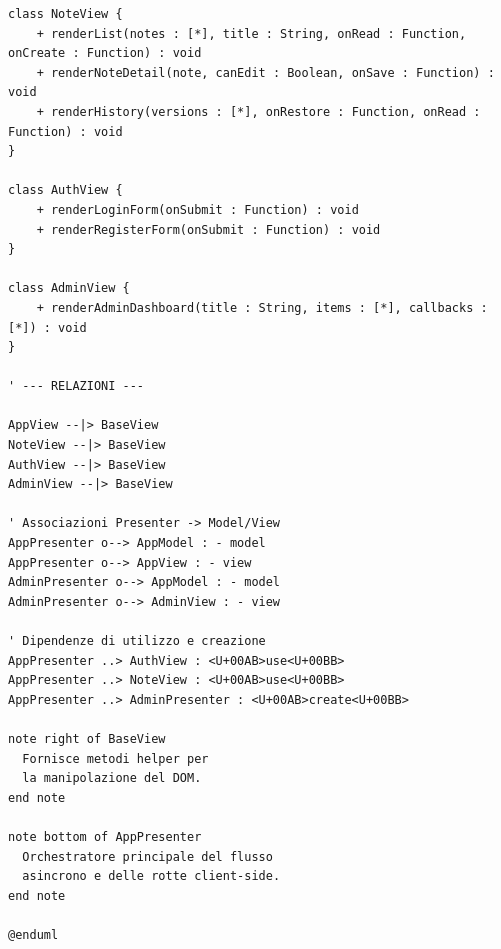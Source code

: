 \begin{verbatim}
class NoteView {
    + renderList(notes : [*], title : String, onRead : Function, onCreate : Function) : void
    + renderNoteDetail(note, canEdit : Boolean, onSave : Function) : void
    + renderHistory(versions : [*], onRestore : Function, onRead : Function) : void
}

class AuthView {
    + renderLoginForm(onSubmit : Function) : void
    + renderRegisterForm(onSubmit : Function) : void
}

class AdminView {
    + renderAdminDashboard(title : String, items : [*], callbacks : [*]) : void
}

' --- RELAZIONI ---

AppView --|> BaseView
NoteView --|> BaseView
AuthView --|> BaseView
AdminView --|> BaseView

' Associazioni Presenter -> Model/View
AppPresenter o--> AppModel : - model
AppPresenter o--> AppView : - view
AdminPresenter o--> AppModel : - model
AdminPresenter o--> AdminView : - view

' Dipendenze di utilizzo e creazione
AppPresenter ..> AuthView : <U+00AB>use<U+00BB>
AppPresenter ..> NoteView : <U+00AB>use<U+00BB>
AppPresenter ..> AdminPresenter : <U+00AB>create<U+00BB>

note right of BaseView
  Fornisce metodi helper per 
  la manipolazione del DOM.
end note

note bottom of AppPresenter
  Orchestratore principale del flusso 
  asincrono e delle rotte client-side.
end note

@enduml
\end{verbatim}


